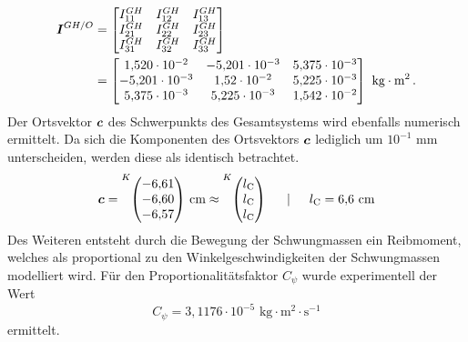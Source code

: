 \begin{equation}
\begin{split}
\boldsymbol{I}^{GH/O} &= \begin{bmatrix}
I^{GH}_{\text{11}} & I^{GH}_{\text{12}} & I^{GH}_{\text{13}} \\
I^{GH}_{\text{21}} & I^{GH}_{\text{22}} & I^{GH}_{\text{23}} \\
I^{GH}_{\text{31}} & I^{GH}_{\text{32}} & I^{GH}_{\text{33}}
\end{bmatrix} \\
&=
\begin{bmatrix}
1{,}520\cdot 10^{-2} & -5{,}201\cdot 10^{-3} & 5{,}375\cdot 10^{-3} \\
-5{,}201\cdot 10^{-3} & 1{,}52\cdot 10^{-2} & 5{,}225\cdot 10^{-3} \\
5{,}375\cdot 10^{-3} & 5{,}225\cdot 10^{-3} & 1{,}542\cdot 10^{-2}
\end{bmatrix}\text{ kg}\cdot \text{m}^2 \,.
\end{split}
\end{equation}
Der Ortsvektor $\boldsymbol{c}$ des Schwerpunkts des Gesamtsystems wird ebenfalls numerisch ermittelt. Da sich die Komponenten des Ortsvektors $\boldsymbol{c}$ lediglich um $10^{-1}\text{ mm}$ unterscheiden, werden diese als identisch betrachtet.
\begin{equation}
\bs{c} = \vecBS{K}{-6{,}61}{-6{,}60}{-6{,}57}\text{ cm} \approx \vecBS{K}{l\idx{C}}{l\idx{C}}{l\idx{C}} \hspace{15pt} \vert \hspace{15pt} l\idx{C} = 6{,}6\text{ cm}
\end{equation}
Des Weiteren entsteht durch die Bewegung der Schwungmassen ein Reibmoment, welches als proportional zu den Winkelgeschwindigkeiten der Schwungmassen modelliert wird. Für den Proportionalitätsfaktor $C_{\psi}$ wurde experimentell der  Wert 
\begin{equation}
C_{\psi} = 3{,}1176\cdot 10^{-5}\text{ kg}\cdot \text{m}^2 \cdot \text{s}^{-1}
\end{equation}
ermittelt.